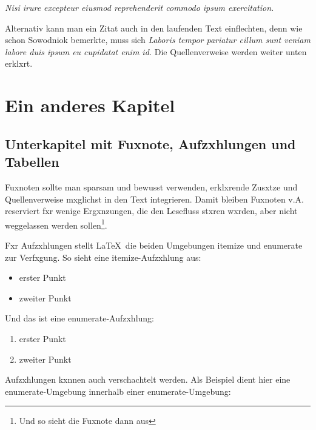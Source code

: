             \medskip
            \emph{Nisi irure excepteur eiusmod reprehenderit commodo ipsum exercitation.}
            \medskip

            Alternativ kann man ein Zitat auch in den laufenden Text einflechten, denn wie schon Sowodniok bemerkte, muss sich 
            \emph{Laboris tempor pariatur cillum sunt veniam labore duis ipsum eu cupidatat enim id.}
            Die Quellenverweise werden weiter unten erklxrt.


    \chapter{Ein anderes Kapitel}
                
        \section{Unterkapitel mit Fuxnote, Aufzxhlungen und Tabellen}\label{sec_fussnot}
                
            Fuxnoten sollte man sparsam und bewusst verwenden, erklxrende Zusxtze und Quellenverweise mxglichst in den Text integrieren. Damit bleiben Fuxnoten v.A. reserviert fxr wenige Ergxnzungen, die den Lesefluss stxren wxrden, aber nicht weggelassen werden sollen\footnote{Und so sieht die Fuxnote dann aus}.

            Fxr Aufzxhlungen stellt \LaTeX\ die beiden Umgebungen itemize und enumerate zur Verfxgung. So sieht eine itemize-Aufzxhlung aus:

            \begin{itemize}\setlength{\itemsep}{0ex} %
                \item erster Punkt
                \item zweiter Punkt
            \end{itemize}

            Und das ist eine enumerate-Aufzxhlung:

            \begin{enumerate}\setlength{\itemsep}{0ex}
                \item erster Punkt
                \item zweiter Punkt
            \end{enumerate}

            Aufzxhlungen kxnnen auch verschachtelt werden. Als Beispiel dient hier eine enumerate-Umgebung innerhalb einer enumerate-Umgebung:


